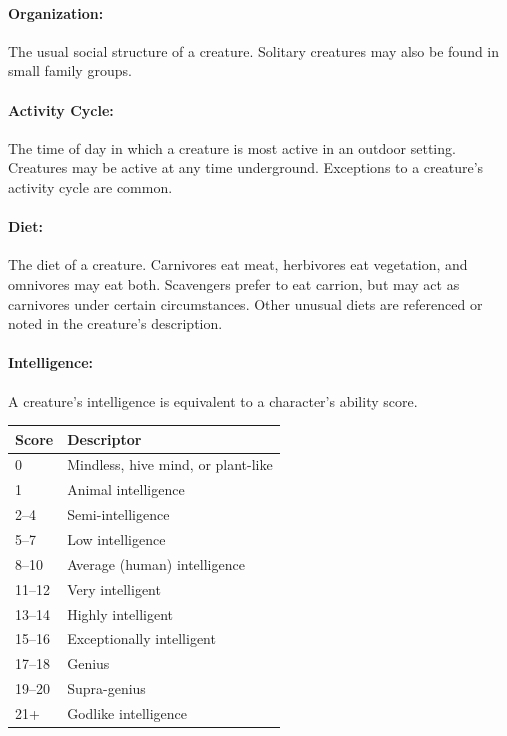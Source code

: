 \begin{multicols}{2}
\begin{minipage}{\columnwidth}
\end{minipage}

\paragraph{Organization:} The usual social structure of a creature. Solitary creatures may also be found in small family groups.

\paragraph{Activity Cycle:} The time of day in which a creature is most active in an outdoor setting. Creatures may be active at any time underground. Exceptions to a creature's activity cycle are common.

\paragraph{Diet:} The diet of a creature. Carnivores eat meat, herbivores eat vegetation, and omnivores may eat both. Scavengers prefer to eat carrion, but may act as carnivores under certain circumstances. Other unusual diets are referenced or noted in the creature's description.

\paragraph{Intelligence:} A creature's intelligence is equivalent to a character's ability score.

\noindent
\begin{minipage}{\columnwidth}

\noindent
\begin{tabular}{|p{}|p{}|}
\hline
Score	& Descriptor \\
\hline\hline
\rowcolor[gray]{.9}0		& Mindless, hive mind, or plant-like \\
1		& Animal intelligence \\
\rowcolor[gray]{.9}2--4	& Semi-intelligence \\
5--7	& Low intelligence	\\
\rowcolor[gray]{.9}8--10	& Average (human) intelligence \\
11--12	& Very intelligent \\
\rowcolor[gray]{.9}13--14	& Highly intelligent \\
15--16	& Exceptionally intelligent \\
\rowcolor[gray]{.9}17--18	& Genius \\
19--20	& Supra-genius \\
\rowcolor[gray]{.9}21+		& Godlike intelligence \\
\hline
\end{tabular}


\end{minipage}
\end{multicols}
